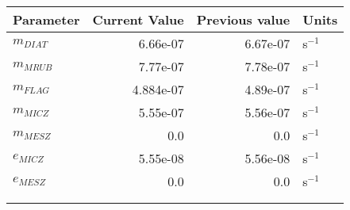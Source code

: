    \small
   \centering
   \begin{tabular}{lrrl}\toprule
    Parameter & Current Value & Previous value & Units \\ \midrule
     $m_{DIAT}$ & 6.66e-07 & 6.67e-07 & s$^{-1}$ \\
     $m_{MRUB}$ & 7.77e-07 & 7.78e-07 & s$^{-1}$ \\
     $m_{FLAG}$ & 4.884e-07 & 4.89e-07 & s$^{-1}$ \\
     $m_{MICZ}$ & 5.55e-07 & 5.56e-07 & s$^{-1}$ \\
     $m_{MESZ}$ & 0.0 & 0.0 & s$^{-1}$ \\
     $e_{MICZ}$ & 5.55e-08 & 5.56e-08 & s$^{-1}$ \\
     $e_{MESZ}$ & 0.0 & 0.0 & s$^{-1}$ \\
   \midrule
 \\ \\   \end{tabular}
